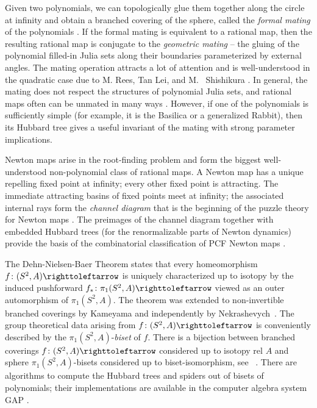 \documentclass{amsart}
\theoremstyle{plain}
\theoremstyle{definition}
\theoremstyle{remark}
\newcommand{\reminder}[1]{\textsl{$\lhd\rhd$#1$\lhd\rhd$}\marginpar{$\lhd\rhd\lhd\rhd\lhd\rhd$}}%
\newcommand{\hide}[1]{}
\newcommand\selfmap{\righttoleftarrow}
\begin{document}
Given two polynomials, we can topologically glue them together along the circle at infinity and obtain a branched covering of the sphere, called the \emph{formal mating} of the polynomials \cite{Douady_Mating,Meyer_Mating}.  If the formal mating is equivalent to a rational map, then the resulting rational map is conjugate to the \emph{geometric mating} -- the gluing of the polynomial filled-in Julia sets along their boundaries parameterized by external angles. The mating operation attracts a lot of attention \cite{MatingQuestions} and is well-understood in the quadratic case due to M. Rees, Tan Lei, and M. ~Shishikura \cite{Rees_1,TanLeiMatings,Shishikura_Rees}. In general, the mating does not respect the structures of polynomial Julia sets, and rational maps often can be unmated in many ways \cite{M_unmating}.  However, if one of the polynomials is sufficiently simple (for example,  it is the Basilica or a generalized Rabbit), then its Hubbard tree gives a useful invariant of the mating with strong parameter implications.
 

Newton maps arise in the root-finding problem and form the biggest  well-understood non-polynomial class of rational maps. A Newton map  has a unique repelling fixed point at infinity; every other fixed point is attracting. The immediate attracting basins of fixed points meet at infinity; the associated internal rays form the \emph{channel diagram} that is the beginning of the puzzle theory for Newton maps \cite{ClassNewtonFixed, NewtonRigidity}.  The preimages of the channel diagram together with embedded Hubbard trees (for the renormalizable parts of Newton dynamics) provide the basis of the combinatorial classification of PCF Newton maps \cite{RussellDierk_Class}.




The Dehn-Nielsen-Baer Theorem states that every homeomorphism $f\colon (S^2,A)\selfmap$ is uniquely characterized up to isotopy by the induced pushforward $f_*\colon\pi_1(S^2,A)\selfmap$ viewed as an outer automorphism of $\pi_1(S^2,A)$. The theorem was extended to non-invertible branched coverings by Kameyama \cite{KameyamaThEq} and independently by Nekrashevych~\cite{Nekra}. The group theoretical data arising from $f\colon (S^2,A)\selfmap$ is conveniently described by the $\pi_1(S^2,A)$-\emph{biset} of $f$. There is a bijection between branched coverings $f\colon (S^2,A)\selfmap$ considered up to isotopy rel $A$ and sphere $\pi_1(S^2,A)$-bisets considered up to biset-isomorphism, see ~\cite[Theorem 2.8]{BD_Dec}. There are algorithms to compute the Hubbard trees and spiders out of bisets of polynomials; their implementations are available in the computer algebra system GAP \cite{GAP_IMG}.
\end{document}
